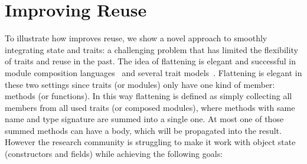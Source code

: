 \section{Improving Reuse}




To illustrate how \name improves reuse,
we show a novel approach
to smoothly integrating state and traits: a challenging problem that has limited the flexibility of traits and
reuse in the past.
The idea of flattening is elegant and successful in module
composition languages~\cite{ancona_zucca_2002} and several trait
models~\cite{ducasse2006traits,Bergel2007,BETTINI2013521,fjig}. 
Flattening is elegant in these two settings
since traits (or modules) only have one kind of member: methods (or functions). In this way 
flattening is defined as simply collecting 
all members from all used traits (or composed modules), where methods with same name and type signature are summed into a single one.
At most one of those summed methods can have a body, which will be propagated into the result.
 However the research
community is struggling to make it work with object state (constructors
and fields) while achieving the following goals:

